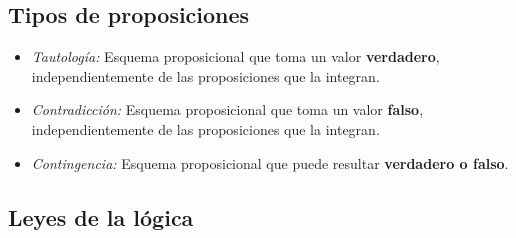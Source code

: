 \documentclass[a4paper, twoside]{article}
\begin{document}
\subsection{Tipos de proposiciones}
\begin{itemize}
	\item \emph {Tautología:} Esquema proposicional que toma un valor \textbf{verdadero}, independientemente de las proposiciones que la integran. 

	\item \emph {Contradicción:} Esquema proposicional que toma un valor \textbf{falso}, independientemente de las proposiciones que la integran. 

	\item \emph {Contingencia:} Esquema proposicional que puede resultar \textbf{verdadero o falso}.
\end{itemize}

\subsection{Leyes de la lógica}
\end{document}
